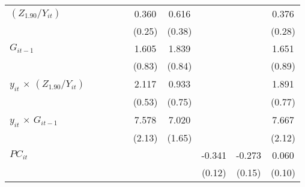 \documentclass[12pt, a4paper]{article}
\begin{document}
\begin{table}[htbp]
\begin{threeparttable}
{\begin{tabular}{l*{9}{c}}
					$(Z_{1.90}/Y_{it})$          &                     &                     &                     &                     &       0.360         &       0.616         &                     &                     &       0.376         \\
					&                     &                     &                     &                     &      (0.25)         &      (0.38)         &                     &                     &      (0.28)         \\
					$G_{it-1}$           &                     &                     &                     &                     &       1.605         &       1.839\sym{*}  &                     &                     &       1.651         \\
					&                     &                     &                     &                     &      (0.83)         &      (0.84)         &                     &                     &      (0.89)         \\
					$y_{it}$ $\times$ $(Z_{1.90}/Y_{it})$&                     &                     &                     &                     &       2.117\sym{***}&       0.933         &                     &                     &       1.891\sym{*}  \\
					&                     &                     &                     &                     &      (0.53)         &      (0.75)         &                     &                     &      (0.77)         \\
					$y_{it}$ $\times$ $G_{it-1}$&                     &                     &                     &                     &       7.578\sym{***}&       7.020\sym{***}&                     &                     &       7.667\sym{***}\\
					&                     &                     &                     &                     &      (2.13)         &      (1.65)         &                     &                     &      (2.12)         \\
					$PC_{it}$                &                     &                     &                     &                     &                     &                     &      -0.341\sym{**} &      -0.273         &       0.060         \\
					&                     &                     &                     &                     &                     &                     &      (0.12)         &      (0.15)         &      (0.10)         \\

\end{tabular}}
\end{threeparttable}
\end{table}
\end{document}
